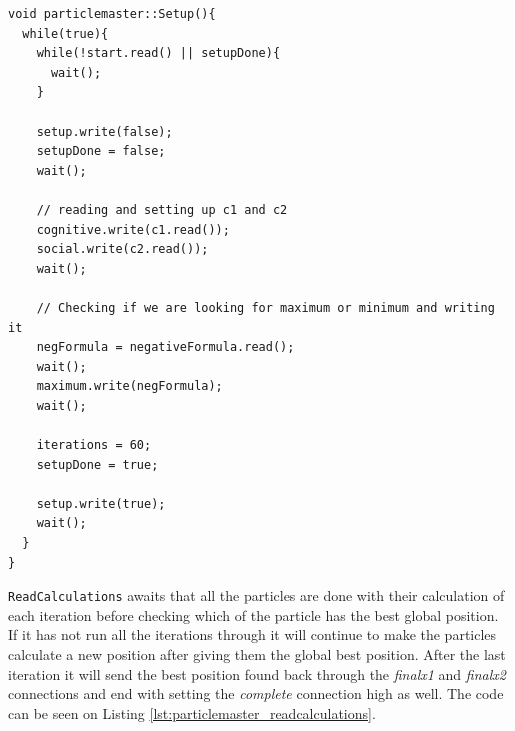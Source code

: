 \begin{lstlisting}[style=customc++, label={lst:particlemaster_setup}, caption={Setup thread of ParticleMaster.}]
void particlemaster::Setup(){
  while(true){
    while(!start.read() || setupDone){
      wait();
    }

    setup.write(false);
    setupDone = false;
    wait();

    // reading and setting up c1 and c2
    cognitive.write(c1.read());
    social.write(c2.read());
    wait();

    // Checking if we are looking for maximum or minimum and writing it
    negFormula = negativeFormula.read();
    wait();
    maximum.write(negFormula);
    wait();

    iterations = 60;
    setupDone = true;

    setup.write(true);
    wait();
  }
}
\end{lstlisting}

\texttt{ReadCalculations} awaits that all the particles are done with their calculation of each iteration before checking which of the particle has the best global position. If it has not run all the iterations through it will continue to make the particles calculate a new position after giving them the global best position. After the last iteration it will send the best position found back through the \textit{finalx1} and \textit{finalx2} connections and end with setting the \textit{complete} connection high as well. The code can be seen on Listing \ref{lst:particlemaster_readcalculations}.\\

